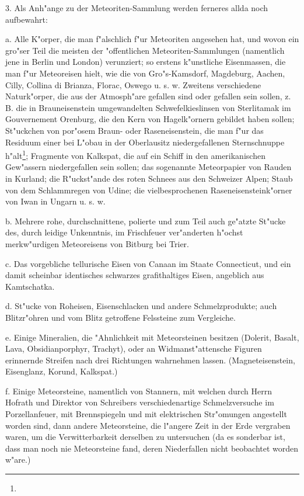 \documentclass[a4paper, 11pt, oneside, polutonikogreek, german]{article}
\begin{document}
3. Als Anh"ange zu der Meteoriten-Sammlung werden ferneres allda noch aufbewahrt:

a. Alle K"orper, die man f"alschlich f"ur Meteoriten angesehen hat, und wovon ein gro"ser Teil die meisten der "offentlichen Meteoriten-Sammlungen (namentlich jene in Berlin und London) verunziert; so erstens k"unstliche Eisenmassen, die man f"ur Meteoreisen hielt, wie die von Gro"s-Kamsdorf‚ Magdeburg, Aachen, Cilly, Collina di Brianza, Florac, Oswego u. s. w. Zweitens verschiedene Naturk"orper, die aus der Atmosph"are gefallen sind oder gefallen sein sollen, z. B. die in Brauneisenstein umgewandelten Schwefelkieslinsen von Sterlitamak im Gouvernement Orenburg, die den Kern von Hagelk"ornern gebildet haben sollen; St"uckchen von por"osem Braun- oder Raseneisenstein, die man f"ur das Residuum einer bei L"obau in der Oberlausitz niedergefallenen Sternschnuppe h"alt\footnote{}; Fragmente von Kalkspat, die auf ein Schiff in den amerikanischen Gew"assern niedergefallen sein sollen; das sogenannte Meteorpapier von Rauden in Kurland; die R"uckst"ande des roten Schnees aus den Schweizer Alpen; Staub von dem Schlammregen von Udine; die vielbesprochenen Raseneisensteink"orner von Iwan in Ungarn u. s. w.

b. Mehrere rohe, durchschnittene, polierte und zum Teil auch ge"atzte St"ucke des, durch leidige Unkenntnis, im Frischfeuer ver"anderten h"ochst merkw"urdigen Meteoreisens von Bitburg bei Trier.

c. Das vorgebliche tellurische Eisen von Canaan im Staate Connecticut, und ein damit scheinbar identisches schwarzes grafithaltiges Eisen, angeblich aus Kamtschatka.

d. St"ucke von Roheisen, Eisenschlacken und andere Schmelzprodukte; auch Blitzr"ohren und vom Blitz getroffene Felssteine zum Vergleiche.

e. Einige Mineralien, die "Ahnlichkeit mit Meteorsteinen besitzen (Dolerit, Basalt, Lava, Obsidianporphyr, Trachyt), oder an Widmanst"attensche Figuren erinnernde Streifen nach drei Richtungen wahrnehmen lassen. (Magneteisenstein, Eisenglanz, Korund, Kalkspat.)

f. Einige Meteorsteine, namentlich von Stannern, mit welchen durch Herrn Hofrath und Direktor von Schreibers verschiedenartige Schmelzversuche im Porzellanfeuer, mit Brennspiegeln und mit elektrischen Str"omungen angestellt worden sind, dann andere Meteorsteine, die l"angere Zeit in der Erde vergraben waren, um die Verwitterbarkeit derselben zu untersuchen (da es sonderbar ist, dass man noch nie Meteorsteine fand, deren Niederfallen nicht beobachtet worden w"are.)
\end{document}
